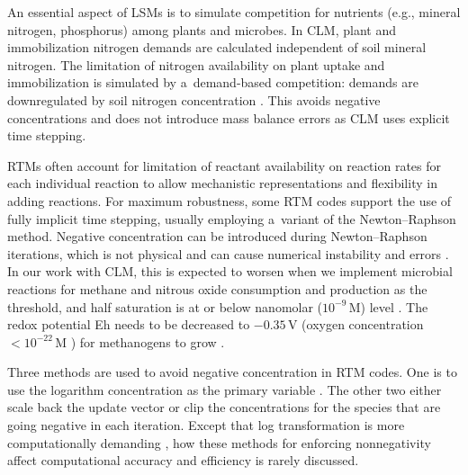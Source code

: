 \documentclass[gmdd, online, hvmath]{copernicus}
\begin{document}
      An essential aspect of LSMs is to simulate competition for nutrients
      (e.g., mineral nitrogen, phosphorus) among plants and microbes. In
      CLM, plant and immobilization nitrogen demands are calculated
      independent of soil mineral nitrogen. The limitation of nitrogen
      availability on plant uptake and immobilization is simulated by
      a~demand-based competition: demands are downregulated by soil nitrogen
      concentration \citep{Oleson2013,Thornton2005}.  This avoids negative
      concentrations and does not introduce mass balance errors
      \citep{Tang2015} as CLM uses explicit time stepping.

      RTMs often account for limitation of reactant availability on reaction
      rates for each individual reaction to allow mechanistic
      representations and flexibility in adding reactions. For maximum
      robustness, some RTM codes support the use of fully implicit time
      stepping, usually employing a~variant of the Newton--Raphson
      method. Negative concentration can be introduced during
      Newton--Raphson iterations, which is not physical and can cause
      numerical instability and errors \citep{Shampine2005}. In our work
      with CLM, this is expected to worsen when we implement microbial
      reactions for methane and nitrous oxide consumption and production as
      the threshold, and half saturation is at or below nanomolar
      ($10^{-9}$\,\unit{M}) level \citep{Conrad1996}. The redox potential Eh
      needs to be decreased to $-0.35$\,\unit{V} (oxygen concentration
      $<10^{-22}$\,\unit{M} \citealp{Hungate1975}) for methanogens to grow
      \citep{Jarrell1985}.

      Three methods are used to avoid negative concentration in RTM
      codes. One is to use the logarithm concentration as the primary
      variable \citep{Bethke2007,Hammond2003,Parkhurst1999}. The other two
      either scale back the update vector \citep{Bethke2007,Hammond2003} or
      clip the concentrations for the species that are going negative
      \citep{Yeh2004,White2005,Xu2014} in each iteration. Except that log
      transformation is more computationally demanding \citep{Hammond2003},
      how these methods for enforcing nonnegativity affect computational
      accuracy and efficiency is rarely discussed.
\end{document}
